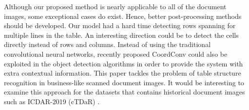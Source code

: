 \documentclass{ieeeaccess}
\begin{document}
Although our proposed method is nearly applicable to all of the document images, some exceptional cases do exist. Hence, better post-processing methods should be developed. Our model had a hard time detecting rows spanning for multiple lines in the table. An interesting direction could be to detect the cells directly instead of rows and columns. Instead of using the traditional convolutional neural networks, recently proposed  CoordConv \cite{b57} could also be exploited in the object detection algorithms in order to provide the system with extra contextual information. This paper tackles the problem of table structure recognition in business-like scanned document images. It would be interesting to examine this approach for the datasets that contains historical document images such as ICDAR-2019 (cTDaR) \cite{b32}.
\end{document}
